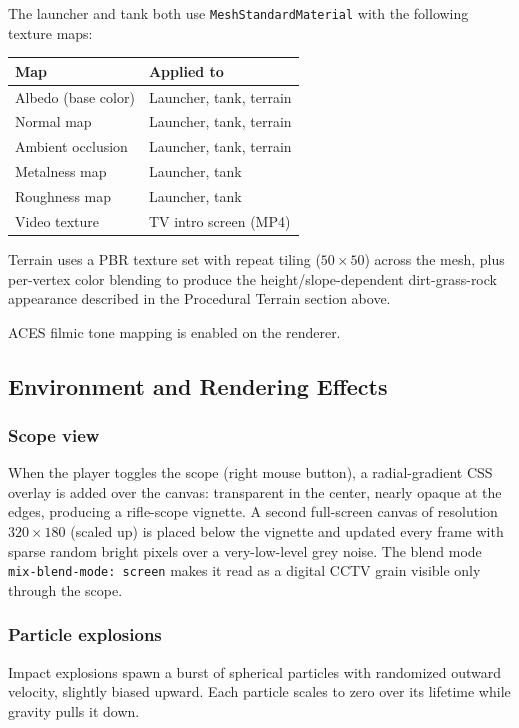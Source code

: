\documentclass[11pt, a4paper]{article}
\begin{document}
	The launcher and tank both use \texttt{MeshStandardMaterial} with the following
	texture maps:

	\begin{center}
		\begin{tabular}{ll}
			\toprule
			\textbf{Map} & \textbf{Applied to} \\
			\midrule
			Albedo (base color) & Launcher, tank, terrain \\
			Normal map          & Launcher, tank, terrain \\
			Ambient occlusion   & Launcher, tank, terrain \\
			Metalness map       & Launcher, tank \\
			Roughness map       & Launcher, tank \\
			Video texture       & TV intro screen (MP4) \\
			\bottomrule
		\end{tabular}
	\end{center}

	Terrain uses a PBR texture set with repeat tiling ($50\times50$) across the mesh, plus
	per-vertex color blending to produce the height/slope-dependent dirt-grass-rock
	appearance described in the Procedural Terrain section above.

	ACES filmic tone mapping is enabled on the renderer.

	\subsection{Environment and Rendering Effects}

	\subsubsection{Scope view}
	When the player toggles the scope (right mouse button), a radial-gradient CSS overlay
	is added over the canvas: transparent in the center, nearly opaque at the edges,
	producing a rifle-scope vignette. A second full-screen canvas of resolution
	$320\times180$ (scaled up) is placed below the vignette and updated every frame with
	sparse random bright pixels over a very-low-level grey noise. The blend mode
	\texttt{mix-blend-mode:~screen} makes it read as a digital CCTV grain visible only
	through the scope.

	\subsubsection{Particle explosions}
	Impact explosions spawn a burst of spherical particles with randomized outward velocity,
	slightly biased upward. Each particle scales to zero over its lifetime while gravity
	pulls it down.
\end{document}
